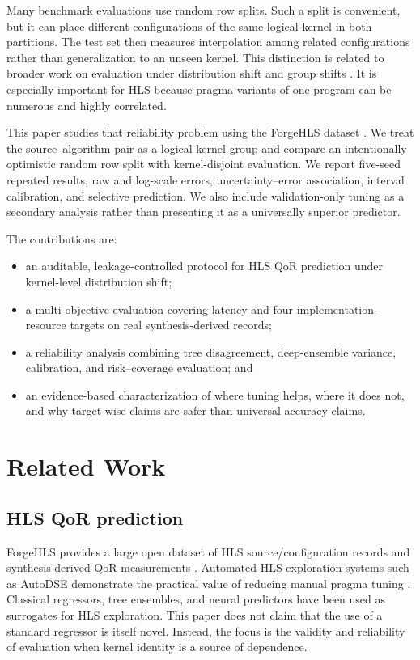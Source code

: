 \documentclass[conference]{IEEEtran}
\begin{document}
Many benchmark evaluations use random row splits. Such a split is convenient, but it can place different configurations of the same logical kernel in both partitions. The test set then measures interpolation among related configurations rather than generalization to an unseen kernel. This distinction is related to broader work on evaluation under distribution shift and group shifts \cite{koh2021wilds,sagawa2020distributionally,chen2021mandoline}. It is especially important for HLS because pragma variants of one program can be numerous and highly correlated.

This paper studies that reliability problem using the ForgeHLS dataset \cite{peng2025forgehls}. We treat the source--algorithm pair as a logical kernel group and compare an intentionally optimistic random row split with kernel-disjoint evaluation. We report five-seed repeated results, raw and log-scale errors, uncertainty--error association, interval calibration, and selective prediction. We also include validation-only tuning as a secondary analysis rather than presenting it as a universally superior predictor.

The contributions are:
\begin{itemize}
    \item an auditable, leakage-controlled protocol for HLS QoR prediction under kernel-level distribution shift;
    \item a multi-objective evaluation covering latency and four implementation-resource targets on real synthesis-derived records;
    \item a reliability analysis combining tree disagreement, deep-ensemble variance, calibration, and risk--coverage evaluation; and
    \item an evidence-based characterization of where tuning helps, where it does not, and why target-wise claims are safer than universal accuracy claims.
\end{itemize}

\section{Related Work}
\subsection{HLS QoR prediction}
ForgeHLS provides a large open dataset of HLS source/configuration records and synthesis-derived QoR measurements \cite{peng2025forgehls}. Automated HLS exploration systems such as AutoDSE demonstrate the practical value of reducing manual pragma tuning \cite{sohrabizadeh2022autodse}. Classical regressors, tree ensembles, and neural predictors have been used as surrogates for HLS exploration. This paper does not claim that the use of a standard regressor is itself novel. Instead, the focus is the validity and reliability of evaluation when kernel identity is a source of dependence.
\end{document}

